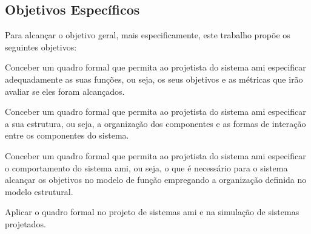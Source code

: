 \subsection{Objetivos Específicos}
\label{sec:objetivos-especificos}

    Para alcançar o objetivo geral, mais especificamente, este trabalho propõe os seguintes objetivos:
    
    \begin{alineas}
		\item Conceber um quadro formal que permita ao projetista do sistema \acrshort{ami} especificar adequadamente as suas funções, ou seja, os seus objetivos e as métricas que irão avaliar se eles foram alcançados. 
		\item Conceber um quadro formal que permita ao projetista do sistema \acrshort{ami} especificar a sua estrutura, ou seja, a organização dos componentes e as formas de interação entre os componentes do sistema.
		\item Conceber um quadro formal que permita ao projetista do sistema \acrshort{ami} especificar o comportamento do sistema \acrshort{ami}, ou seja, o que é necessário para o sistema alcançar os objetivos no modelo de função empregando a organização definida no modelo estrutural.
		\item Aplicar o quadro formal no projeto de sistemas \acrshort{ami} e na simulação de sistemas projetados.
	\end{alineas}